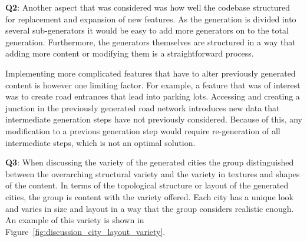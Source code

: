 \textbf{Q2}:
Another aspect that was considered was how well the codebase structured for replacement and expansion of new features.
As the generation is divided into several sub-generators it would be easy to add more generators on to the total generation.
Furthermore, the generators themselves are structured in a way that adding more content or modifying them is a straightforward process.

Implementing more complicated features that have to alter previously generated content is however one limiting factor.
For example, a feature that was of interest was to create road entrances that lead into parking lots.
Accessing and creating a junction in the previously generated road network introduces new data that intermediate generation steps have not previously considered.
Because of this, any modification to a previous generation step would require re-generation of all intermediate steps, which is not an optimal solution.

\textbf{Q3}:
When discussing the variety of the generated cities the group distinguished between the overarching structural variety and the variety in textures and shapes of the content.
In terms of the topological structure or layout of the generated cities, the group is content with the variety offered.
Each city has a unique look and varies in size and layout in a way that the group considers realistic enough.
An example of this variety is shown in Figure~\ref{fig:discussion_city_layout_variety}.

